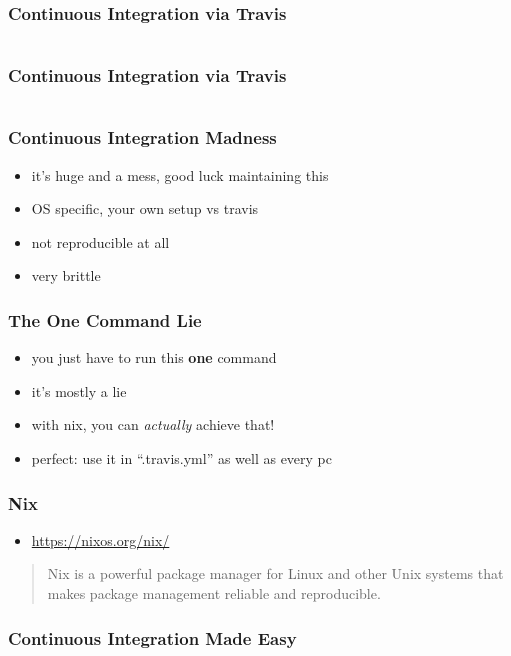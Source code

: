 \documentclass{beamer}
\begin{document}
\begin{frame}
  \frametitle{Continuous Integration via Travis}
  \inputminted[linenos=false, fontsize=\tiny, firstline=61, lastline=90]{yaml}{static-source/long-travis-ci.yml}
\end{frame}

\begin{frame}
  \frametitle{Continuous Integration via Travis}
  \inputminted[linenos=false, fontsize=\tiny, firstline=91, lastline=120]{yaml}{static-source/long-travis-ci.yml}
\end{frame}

\begin{frame}
  \frametitle{Continuous Integration Madness}
  \begin{itemize}
  \item it's huge and a mess, good luck maintaining this
  \item OS specific, your own setup vs travis
  \item not reproducible at all
  \item very brittle
  \end{itemize}
\end{frame}

\begin{frame}
  \frametitle{The One Command Lie}
  \begin{itemize}
  \item you just have to run this \textbf{one} command
  \item it's mostly a lie
  \item with nix, you can \textit{actually} achieve that!
  \item perfect: use it in ``.travis.yml'' as well as every pc
  \end{itemize}
\end{frame}

\begin{frame}
  \frametitle{Nix}
  \begin{itemize}
  \item \url{https://nixos.org/nix/}
  \end{itemize}
  \begin{quote}
    Nix is a powerful package manager for Linux and other Unix systems that makes package management reliable and reproducible.
  \end{quote}
\end{frame}

\begin{frame}
  \frametitle{Continuous Integration Made Easy}
  \inputminted{yaml}{snippets/travis.yml}
\end{frame}
\end{document}
